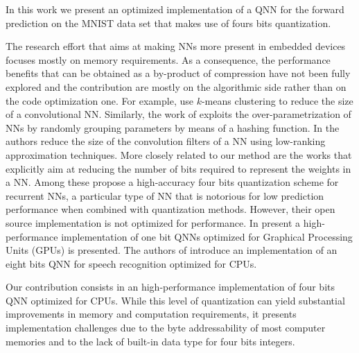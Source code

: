In this work we present an optimized implementation of a QNN for the forward prediction on the MNIST data set that makes use of fours bits quantization. 

%
%

 The research effort that aims at making NNs more present in embedded devices focuses mostly on memory requirements. As a consequence, the performance benefits that can be obtained as a by-product of compression have not been fully explored and the contribution are mostly on the algorithmic side rather than on the code optimization one. For example, \cite{gong_compressing_2014} use $k$-means clustering to reduce the size of  a convolutional NN. Similarly, the work of \cite{chen_compressing_2015} exploits the over-parametrization of NNs by randomly grouping parameters by means of a hashing function. In \cite{denton_exploiting_2014} the authors reduce the size of the convolution filters of a NN using low-ranking approximation techniques.	 More closely related to our method are the works that explicitly aim at reducing the number of bits required to represent the weights in a NN. Among these \cite{he_effective_2016} propose a high-accuracy four bits quantization scheme for recurrent NNs, a particular type of NN that is notorious for low prediction performance when combined with quantization methods. However, their open source implementation is not optimized for performance. In \cite{hubara_binarized_2016} present a high-performance implementation of one bit QNNs optimized for Graphical Processing Units (GPUs) is presented. The authors of \cite{vanhoucke_improving_2011} introduce an implementation of an eight bits QNN for speech recognition optimized for CPUs.

Our contribution consists in an high-performance implementation of four bits QNN optimized for CPUs. While this level of quantization can yield substantial improvements in memory and computation requirements, it presents implementation challenges due to the byte addressability of most computer memories and to the lack of built-in data type for four bits integers.


